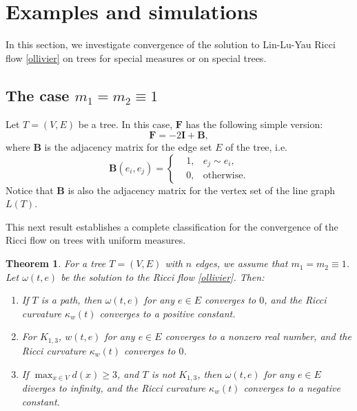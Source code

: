 \documentclass{article}
\newtheorem{theorem}{Theorem}[section]
\begin{document}
\section{Examples and simulations}
In this section, we investigate convergence of the solution to Lin-Lu-Yau Ricci flow \eqref{ollivier} on trees for special measures or on special trees.



\subsection{The case $m_1=m_2\equiv1$}
Let $T=(V,E)$ be a tree. In this case, $\mathbf{F}$ has the following simple version:
    \begin{equation}\label{examp2}
        \mathbf{F}=-2\mathbf{I}+\mathbf{B},
    \end{equation}
    where $\mathbf{B}$ is the adjacency matrix for the edge set $E$ of the tree, i.e.
 \[\textbf{B}(e_i,e_j)=\left\{\begin{aligned}
   &1,& e_j\sim e_i,\\
   &0,&\mbox{otherwise.}
\end{aligned}
  \right.\]     
Notice that $\textbf{B}$ is also the adjacency matrix for the vertex set of the line graph $L(T)$. 

This next result establishes a complete classification for the convergence of the Ricci flow on trees with uniform measures.

\begin{theorem}\label{the:4.1}
\label{coro1}
 For a tree $T=(V,E)$ with $n$ edges,  we assume that $m_1=m_2\equiv1$. Let $\omega(t,e)$ be the solution to the Ricci flow \eqref{ollivier}. Then:
 \begin{enumerate}
    \item If  $T$ is a path, then $\omega(t,e)$ for any $e\in E$  converges to $0$, and the Ricci curvature $\kappa_w(t)$ converges to a positive constant.   
    \item For $K_{1,3}$,  $w(t,e)$ for any $e\in E$  converges to a nonzero real number, and the Ricci curvature $\kappa_w(t)$ converges to $0$.
    \item If $\max_{x\in V}d(x)\geq 3$, and $T$ is not $K_{1,3}$, then $\omega(t,e)$ for any $e\in E$ diverges to infinity, and the Ricci curvature $\kappa_w(t)$ converges to a negative constant.
 \end{enumerate}
\end{theorem}
\end{document}
